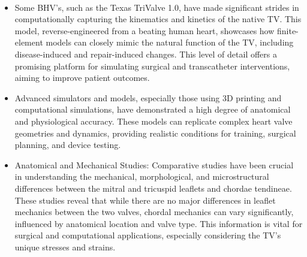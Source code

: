 \\
\begin{itemize}
    \item Some \gls{BHV}'s, such as the Texas TriValve 1.0, have made significant strides in computationally capturing the kinematics and kinetics of the native \gls{TV}. This model, reverse-engineered from a beating human heart, showcases how finite-element models can closely mimic the natural function of the \gls{TV}, including disease-induced and repair-induced changes. This level of detail offers a promising platform for simulating surgical and transcatheter interventions, aiming to improve patient outcomes. ~
    \item Advanced simulators and models, especially those using 3D printing and computational simulations, have demonstrated a high degree of anatomical and physiological accuracy. These models can replicate complex heart valve geometries and dynamics, providing realistic conditions for training, surgical planning, and device testing. ~

    \item Anatomical and Mechanical Studies: Comparative studies have been crucial in understanding the mechanical, morphological, and microstructural differences between the mitral and tricuspid leaflets and chordae tendineae. These studies reveal that while there are no major differences in leaflet mechanics between the two valves, chordal mechanics can vary significantly, influenced by anatomical location and valve type. This information is vital for surgical and computational applications, especially considering the \gls{TV}'s unique stresses and strains. ~
\end{itemize}

